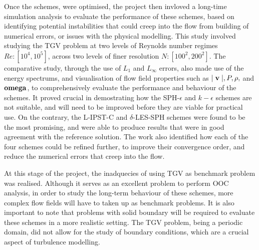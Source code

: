 Once the schemes, were optimised, the project then invloved a long-time simulation analysis to evaluate the performance of these schemes, based on identifying potential instabilities that could creep into the flow from building of numerical errors, or issues with the physical modelling. This study involved studying the TGV problem at two levels of Reynolds number regimes $Re: [10^4, 10^5]$, across two levels of finer resolution $N: [100^2, 200^2]$.
The comparative study, through the use of $L_1$ and $L_{\infty}$ errors, also made use of the energy spectrums, and visualisation of flow field properties such as $\mid \mathbf{v} \mid, P, \rho,$ and  $\mathbf{omega}$, to comprehensively evaluate the performance and behaviour of the schemes.
It proved crucial in demostrating how the SPH-$\epsilon$ and $k-\epsilon$ schemes are not suitable, and will need to be improved before they are viable for practical use. 
On the contrary, the L-IPST-C and $\delta$-LES-SPH schemes were found to be the most promising, and were able to produce results that were in good agreement with the reference solution.
The work also identified how each of the four schemes could be refined further, to improve their convergence order, and reduce the numerical errors that creep into the flow.

At this stage of the project, the inadquecies of using TGV as benchmark problem was realised. Although it serves as an excellent problem to perform OOC analysis, in order to study the long-term behaviour of these schemes, more complex flow fields will have to taken up as benchmark problems. It is also important to note that problems with solid boundary will be required to evaluate these schemes in a more realistic setting. The TGV problem, being a periodic domain, did not allow for the study of boundary conditions, which are a crucial aspect of turbulence modelling.

